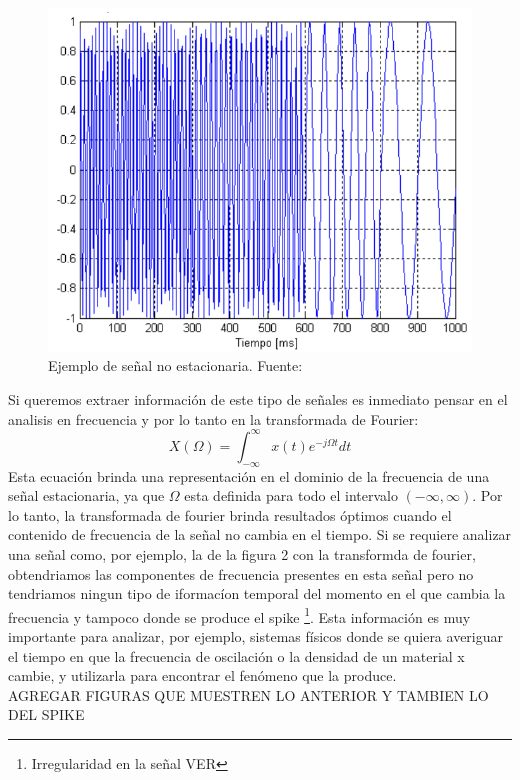 \documentclass{article}
\begin{document}
\begin{itemize}
\begin{figure}[H]
        \includegraphics[scale=0.45]{Fig/2}
        \caption{Ejemplo de señal no estacionaria. Fuente:}
        \label{fig1}
      \end{figure}
\end{itemize}
Si queremos extraer información de este tipo de señales es inmediato pensar en el analisis en frecuencia y por lo tanto en la transformada de Fourier:
\begin{equation}
    X(\Omega) = \int_{-\infty}^{\infty} x(t)e^{-j\Omega t}dt
\end{equation}
Esta ecuación brinda una representación en el dominio de la frecuencia de una señal estacionaria, ya que $\Omega$ esta definida para todo el 
intervalo $(-\infty,\infty)$. Por lo tanto, la transformada de fourier brinda resultados óptimos cuando el contenido de frecuencia de la señal no cambia en el tiempo. Si se requiere 
analizar una señal como, por ejemplo, la de la figura 2 con la transformda de fourier, obtendriamos las componentes de frecuencia presentes en esta señal pero no tendriamos ningun tipo de 
iformacíon temporal del momento en el que cambia la frecuencia y tampoco donde se produce el spike \footnote{Irregularidad en la señal VER}. Esta información es muy importante para analizar, por ejemplo, sistemas físicos donde se quiera averiguar el tiempo en que la frecuencia de oscilación o la densidad de un material x cambie,
y utilizarla para encontrar el fenómeno que la produce.\\
AGREGAR FIGURAS QUE MUESTREN LO ANTERIOR Y TAMBIEN LO DEL SPIKE\\
\end{document}
